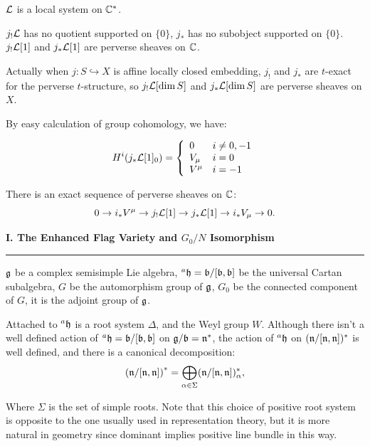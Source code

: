 $\mathcal{L}$ is a local system on $\mathbb{C}^*$.

$j_!\mathcal{L}$ has no quotient supported on $\{0\}$, $j_*$ has no subobject supported on $\{0\}$. $j_!\mathcal{L}[1]$ and $j_*\mathcal{L}[1]$ are perverse sheaves on $\mathbb{C}$.


\begin{rk}
  Actually when $j: S \hookrightarrow  X$ is \colorbox{HighlightColor}{affine locally closed embedding}, $j_!$ and $j_*$ are $t$-exact for the perverse $t$-structure, so $j_!\mathcal{L}[\dim S]$ and $j_*\mathcal{L}[\dim S]$ are perverse sheaves on $X$.
\end{rk}








By easy calculation of group cohomology, we have:

\begin{align*}
  H^i(j_*\mathcal{L}[1]_0) = \left\{
  \begin{array}{ll}
    0 & i \neq 0,-1 \\
    V_{\mu} & i = 0 \\
    V^{\mu} & i = -1
  \end{array}
  \right.
\end{align*}

There is an exact sequence of perverse sheaves on $\mathbb{C}$:
\[0 \to i_*V^{\mu} \to j_!\mathcal{L}[1] \to j_*\mathcal{L}[1] \to i_*V_{\mu} \to 0.\]






\noindent\textbf{\large I. The Enhanced Flag Variety and $G_0/N$ Isomorphism \cite{BB93}}
\vspace{2mm}
\hrule
\vspace{3mm}

$\mathfrak{g}$ be a complex semisimple Lie algebra, ${^{a}\mathfrak{h}} = \mathfrak{b}/[\mathfrak{b},\mathfrak{b}]$ be the universal Cartan subalgebra, $G$ be the automorphism group of $\mathfrak{g}$, $G_0$ be the connected component of $G$, it is the adjoint group of $\mathfrak{g}$.

Attached to ${^{a}\mathfrak{h}}$ is a root system $\Delta$, and the Weyl group $W$. Although there isn't a well defined action of ${^{a}\mathfrak{h}} = \mathfrak{b}/[\mathfrak{b},\mathfrak{b}]$ on $\mathfrak{g}/\mathfrak{b} = \mathfrak{n}^*$, the action of ${^{a}\mathfrak{h}}$ on $(\mathfrak{n}/[\mathfrak{n},\mathfrak{n}])^*$ is well defined, and there is a canonical decomposition:
\[
  \left(\mathfrak{n}/[\mathfrak{n},\mathfrak{n}]\right)^* = \bigoplus_{\alpha \in \Sigma} (\mathfrak{n}/[\mathfrak{n},\mathfrak{n}])^*_{\alpha},
\]

Where $\Sigma$ is the set of simple roots. Note that this choice of positive root system is opposite to the one usually used in representation theory, but it is more natural in geometry since dominant implies positive line bundle in this way.

